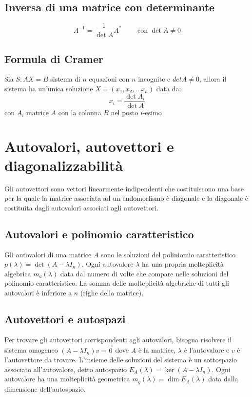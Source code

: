 \documentclass[a4paper]{article}
\begin{document}
\subsection{Inversa di una matrice con determinante}
\[A^{-1} = \frac{1}{\det A} A^* \qquad \text{ con } \det A \neq 0\]

\subsection{Formula di Cramer}
Sia \(S: AX = B\) sistema di \(n\) equazioni con \(n\) incognite e \(det A \neq 0\), allora il sistema ha un'unica soluzione \(X = (x_1, x_2, \dots x_n)\)
data da: \[x_i = \frac{\det A_i}{\det A}\] con \(A_i\) matrice \(A\) con la colonna \(B\) nel posto \(i\)-esimo

\newpage


\section{Autovalori, autovettori e diagonalizzabilità}
Gli autovettori sono vettori linearmente indipendenti che costituiscono una base per la quale la matrice associata ad un endomorfismo
è diagonale e la diagonale è costituita dagli autovalori associati agli autovettori.

\subsection{Autovalori e polinomio caratteristico}
Gli autovalori di una matrice \(A\) sono le soluzioni del poliniomio caratteristico \(p(\lambda) = \det (A - \lambda I_n)\). Ogni
autovalore \(\lambda\) ha una propria molteplicità algebrica \(m_a(\lambda)\) data dal numero di volte che compare nelle soluzioni
del polinomio caratteristico. La somma delle molteplicità algebriche di tutti gli autovalori è inferiore a \(n\) (righe della matrice).

\subsection{Autovettori e autospazi}
Per trovare gli autovettori corrispondenti agli autovalori, bisogna risolvere il sistema omogeneo \((A-\lambda I_n)v = \vec{0}\)
dove \(A\) è la matrice, \(\lambda\) è l'autovalore e \(v\) è l'autovettore da trovare. L'insieme delle soluzioni del sistema è
un sottospazio associato all'autovalore, detto autospazio \(E_A(\lambda) = \ker (A-\lambda I_n)\). Ogni autovalore ha una molteplicità
geometrica \(m_g(\lambda) = \dim E_A(\lambda)\) data dalla dimensione dell'autospazio.
\end{document}
